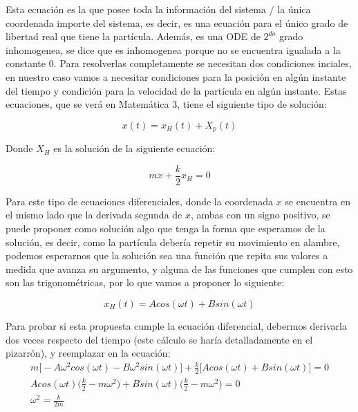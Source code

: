 \documentclass{article}
\begin{document}
\begin{multicols}{2}
Esta ecuación es la que posee toda la información del sistema / la única coordenada importe del sistema, es decir, es una ecuación para el único grado de libertad real que tiene la partícula. Además, es una ODE de $2^{do}$ grado inhomogenea, se dice que es inhomogenea porque no se encuentra igualada a la constante $0$. Para resolverlas completamente se necesitan dos condiciones inciales, en nuestro caso vamos a necesitar condiciones para la posición en algún instante del tiempo y condición para la velocidad de la partícula en algún instante. Estas ecuaciones, que se verá en Matemática 3, tiene el siguiente tipo de solución:

\begin{equation}
    x(t) = x_H(t) + X_p(t)
\end{equation}

Donde $X_H$ es la solución de la siguiente ecuación:

\begin{equation}
    m\ddot{x} + \frac{k}{2}x_H = 0
\end{equation}

Para este tipo de ecuaciones diferenciales, donde la coordenada $x$ se encuentra en el mismo lado que la derivada segunda de $x$, ambas con un signo positivo, se puede proponer como solución algo que tenga la forma que esperamos de la solución, es decir, como la partícula debería repetir su movimiento en alambre, podemos esperarnos que la solución sea una función que repita sus valores a medida que avanza su argumento, y alguna de las funciones que cumplen con esto son las trigonométricas, por lo que vamos a proponer lo siguiente:

\begin{equation}
    x_H(t) = Acos(\omega t) + Bsin(\omega t)
\end{equation}

Para probar si esta propuesta cumple la ecuación diferencial, debermos derivarla dos veces respecto del tiempo (este cálculo se haría detalladamente en el pizarrón), y reemplazar en la ecuación:
\begin{equation}
\begin{split}
    m\big[ -A\omega^2cos(\omega t) - B\omega^2sin(\omega t) \big] + \frac{k}{2}\big[ Acos(\omega t) + Bsin(\omega t) \big] = 0 \\
    Acos(\omega t) \bigg(\frac{k}{2} - m\omega^2\bigg) + Bsin(\omega t)\bigg( \frac{k}{2} - m\omega^2 \bigg) = 0 \\
    \omega^2 = \frac{k}{2m}
\end{split}
\end{equation}


\end{multicols}
\end{document}
